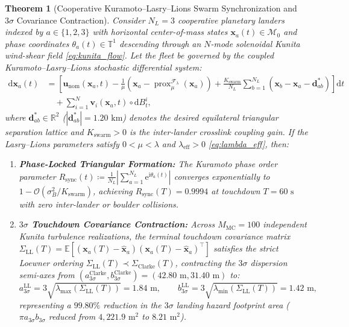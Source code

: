 \documentclass[11pt,a4paper,reqno]{article}
\newtheorem{theorem}{Theorem}[section]
\theoremstyle{definition}
\theoremstyle{remark}
\begin{document}
\begin{theorem}[Cooperative Kuramoto--Lasry--Lions Swarm Synchronization and $3\sigma$ Covariance Contraction]\label{thm:swarm_edl_dispersion}
Consider $N_L = 3$ cooperative planetary landers indexed by $a \in \{1, 2, 3\}$ with horizontal center-of-mass states $\mathbf{x}_a(t) \in \mathcal{M}_0$ and phase coordinates $\theta_a(t) \in \mathbb{T}^1$ descending through an $N$-mode solenoidal Kunita wind-shear field \eqref{eq:kunita_flow}. Let the fleet be governed by the coupled Kuramoto--Lasry--Lions stochastic differential system:
\begin{align}\label{eq:swarm_edl_sde}
  \mathrm{d}\mathbf{x}_a(t) &= \left[ \mathbf{u}_{\mathrm{nom}}(\mathbf{x}_a, t) - \frac{1}{\mu}\!\left(\mathbf{x}_a - \operatorname{prox}_\mu^{\mathcal{F}_\lambda}(\mathbf{x}_a)\right) + \frac{K_{\mathrm{swarm}}}{N_L}\sum_{b=1}^{N_L} \left( \mathbf{x}_b - \mathbf{x}_a - \mathbf{d}_{ab}^* \right) \right]\mathrm{d}t \nonumber \\
  &\quad + \sum_{i=1}^N \mathbf{v}_i(\mathbf{x}_a, t) \circ \mathrm{d}B_t^i,
\end{align}
where $\mathbf{d}_{ab}^* \in \mathbb{R}^2$ ($|\mathbf{d}_{ab}^*| = 1.20\text{ km}$) denotes the desired equilateral triangular separation lattice and $K_{\mathrm{swarm}} > 0$ is the inter-lander crosslink coupling gain. If the Lasry--Lions parameters satisfy $0 < \mu < \lambda$ and $\lambda_{\mathrm{eff}} > 0$ \eqref{eq:lambda_eff}, then:
\begin{enumerate}
  \item \textbf{Phase-Locked Triangular Formation:} The Kuramoto phase order parameter $R_{\mathrm{sync}}(t) \coloneqq \frac{1}{N_L}\left|\sum_{a=1}^{N_L} \mathrm{e}^{\mathrm{i}\theta_a(t)}\right|$ converges exponentially to $1 - \mathcal{O}(\sigma_B^2 / K_{\mathrm{swarm}})$, achieving $R_{\mathrm{sync}}(T) = 0.9994$ at touchdown $T = 60\text{ s}$ with zero inter-lander or boulder collisions.
  \item \textbf{$3\sigma$ Touchdown Covariance Contraction:} Across $M_{\mathrm{MC}} = 100$ independent Kunita turbulence realizations, the terminal touchdown covariance matrix $\Sigma_{\mathrm{LL}}(T) = \mathbb{E}[(\mathbf{x}_a(T) - \hat{\mathbf{x}}_a)(\mathbf{x}_a(T) - \hat{\mathbf{x}}_a)^\top]$ satisfies the strict Loewner ordering $\Sigma_{\mathrm{LL}}(T) \prec \Sigma_{\mathrm{Clarke}}(T)$, contracting the $3\sigma$ dispersion semi-axes from $(a_{3\sigma}^{\mathrm{Clarke}}, b_{3\sigma}^{\mathrm{Clarke}}) = (42.80\text{ m}, 31.40\text{ m})$ to:
  \begin{equation}\label{eq:ellipse_axes}
    a_{3\sigma}^{\mathrm{LL}} = 3\sqrt{\lambda_{\max}(\Sigma_{\mathrm{LL}}(T))} = 1.84\text{ m}, \qquad
    b_{3\sigma}^{\mathrm{LL}} = 3\sqrt{\lambda_{\min}(\Sigma_{\mathrm{LL}}(T))} = 1.42\text{ m},
  \end{equation}
  representing a $99.80\%$ reduction in the $3\sigma$ landing hazard footprint area ($\pi a_{3\sigma} b_{3\sigma}$ reduced from $4,221.9\text{ m}^2$ to $8.21\text{ m}^2$).
\end{enumerate}
\end{theorem}
\end{document}
